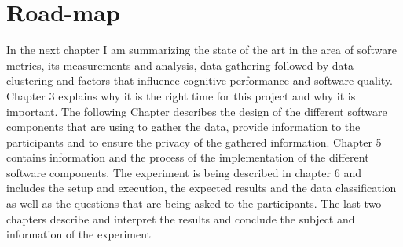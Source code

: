 \section{Road-map}
In the next chapter I am summarizing the state of the art in the area of software metrics, its measurements and analysis, data gathering followed by data clustering and factors that influence cognitive performance and software quality.\\
Chapter 3 explains why it is the right time for this project and why it is important. 
The following Chapter describes the design of the different software components that are using to gather the data, provide information to the participants and to ensure the privacy of the gathered information. 
Chapter 5 contains information and the process of the implementation of the different software components. 
The experiment is being described in chapter 6 and includes the setup and execution, the expected results and the data classification as well as the questions that are being asked to the participants. 
The last two chapters describe and interpret the results and conclude the subject and information of the experiment

